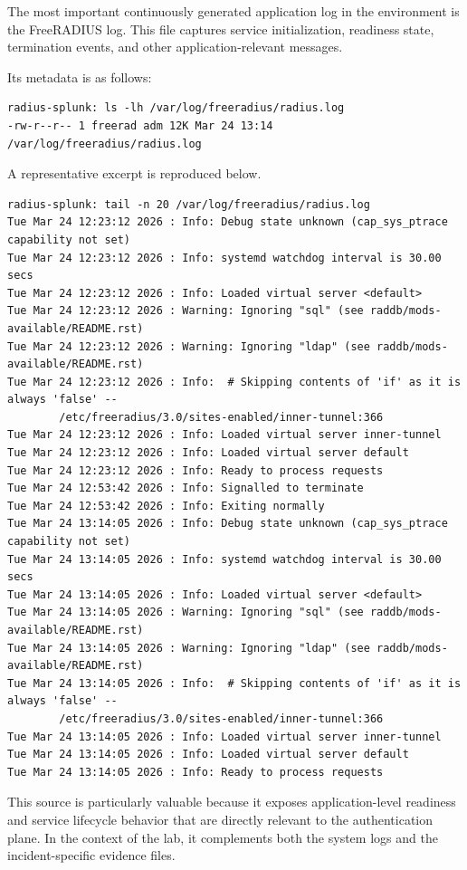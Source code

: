 \documentclass[11pt]{article}
\begin{document}
The most important continuously generated application log in the environment is the FreeRADIUS log. This file captures service initialization, readiness state, termination events, and other application-relevant messages.

Its metadata is as follows:

\begin{verbatim}
radius-splunk: ls -lh /var/log/freeradius/radius.log
-rw-r--r-- 1 freerad adm 12K Mar 24 13:14 /var/log/freeradius/radius.log
\end{verbatim}

A representative excerpt is reproduced below.

\begin{verbatim}
radius-splunk: tail -n 20 /var/log/freeradius/radius.log
Tue Mar 24 12:23:12 2026 : Info: Debug state unknown (cap_sys_ptrace capability not set)
Tue Mar 24 12:23:12 2026 : Info: systemd watchdog interval is 30.00 secs
Tue Mar 24 12:23:12 2026 : Info: Loaded virtual server <default>
Tue Mar 24 12:23:12 2026 : Warning: Ignoring "sql" (see raddb/mods-available/README.rst)
Tue Mar 24 12:23:12 2026 : Warning: Ignoring "ldap" (see raddb/mods-available/README.rst)
Tue Mar 24 12:23:12 2026 : Info:  # Skipping contents of 'if' as it is always 'false' --
        /etc/freeradius/3.0/sites-enabled/inner-tunnel:366
Tue Mar 24 12:23:12 2026 : Info: Loaded virtual server inner-tunnel
Tue Mar 24 12:23:12 2026 : Info: Loaded virtual server default
Tue Mar 24 12:23:12 2026 : Info: Ready to process requests
Tue Mar 24 12:53:42 2026 : Info: Signalled to terminate
Tue Mar 24 12:53:42 2026 : Info: Exiting normally
Tue Mar 24 13:14:05 2026 : Info: Debug state unknown (cap_sys_ptrace capability not set)
Tue Mar 24 13:14:05 2026 : Info: systemd watchdog interval is 30.00 secs
Tue Mar 24 13:14:05 2026 : Info: Loaded virtual server <default>
Tue Mar 24 13:14:05 2026 : Warning: Ignoring "sql" (see raddb/mods-available/README.rst)
Tue Mar 24 13:14:05 2026 : Warning: Ignoring "ldap" (see raddb/mods-available/README.rst)
Tue Mar 24 13:14:05 2026 : Info:  # Skipping contents of 'if' as it is always 'false' -- 
        /etc/freeradius/3.0/sites-enabled/inner-tunnel:366
Tue Mar 24 13:14:05 2026 : Info: Loaded virtual server inner-tunnel
Tue Mar 24 13:14:05 2026 : Info: Loaded virtual server default
Tue Mar 24 13:14:05 2026 : Info: Ready to process requests
\end{verbatim}

This source is particularly valuable because it exposes application-level readiness and service lifecycle behavior that are directly relevant to the authentication plane. In the context of the lab, it complements both the system logs and the incident-specific evidence files.
\end{document}
